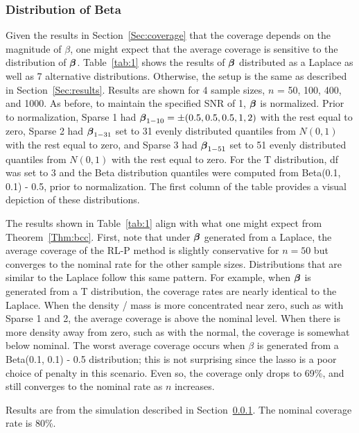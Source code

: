 \subsubsection{Distribution of Beta} \label{Sec:distribution}

Given the results in Section~\ref{Sec:coverage} that the coverage depends on the magnitude of $\beta$, one might expect that the average coverage is sensitive to the distribution of $\boldsymbol{\beta}$. Table~\ref{tab:1} shows the results of $\boldsymbol{\beta}$ distributed as a Laplace as well as 7 alternative distributions. Otherwise, the setup is the same as described in Section~\ref{Sec:results}. Results are shown for 4 sample sizes, $n$ = 50, 100, 400, and 1000. As before, to maintain the specified SNR of 1, $\boldsymbol{\beta}$ is normalized. Prior to normalization, Sparse 1 had $\boldsymbol{\beta}_{1-10} = \pm(0.5, 0.5, 0.5, 1, 2)$ with the rest equal to zero, Sparse 2 had $\boldsymbol{\beta}_{1-31}$ set to 31 evenly distributed quantiles from $N(0, 1)$ with the rest equal to zero, and Sparse 3 had $\boldsymbol{\beta}_{1-51}$ set to 51 evenly distributed quantiles from $N(0, 1)$ with the rest equal to zero. For the T distribution, df was set to 3 and the Beta distribution quantiles were computed from Beta(0.1, 0.1) - 0.5, prior to normalization. The first column of the table provides a visual depiction of these distributions.

The results shown in Table~\ref{tab:1} align with what one might expect from Theorem~\ref{Thm:bcc}. First, note that under $\boldsymbol{\beta}$ generated from a Laplace, the average coverage of the RL-P method is slightly conservative for $n=50$ but converges to the nominal rate for the other sample sizes. Distributions that are similar to the Laplace follow this same pattern. For example, when $\boldsymbol{\beta}$ is generated from a T distribution, the coverage rates are nearly identical to the Laplace. When the density / mass is more concentrated near zero, such as with Sparse 1 and 2, the average coverage is above the nominal level. When there is more density away from zero, such as with the normal, the coverage is somewhat below nominal. The worst average coverage occurs when $\beta$ is generated from a Beta(0.1, 0.1) - 0.5 distribution; this is not surprising since the lasso is a poor choice of penalty in this scenario. Even so, the coverage only drops to 69\%, and still converges to the nominal rate as $n$ increases.

\begin{table}[htb!]
  \centering
  
  \caption{\label{tab:1} Results are from the simulation described in Section~\ref{Sec:distribution}. The nominal coverage rate is 80\%.}
\end{table}


